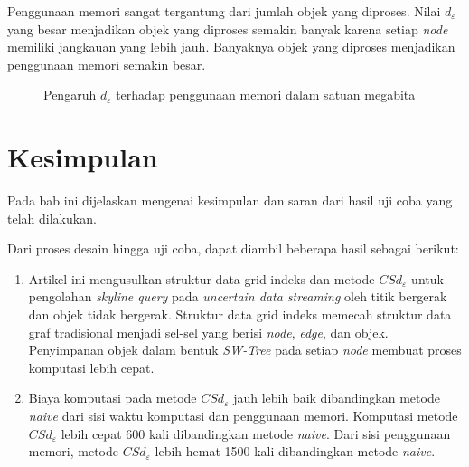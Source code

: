 \documentclass[conference]{IEEEtran}
\begin{document}
Penggunaan memori sangat tergantung dari jumlah objek yang diproses. Nilai $ d_\varepsilon $ yang besar menjadikan objek yang diproses semakin banyak karena setiap \textit{node} memiliki jangkauan yang lebih jauh. Banyaknya objek yang diproses menjadikan penggunaan memori semakin besar.

\begin{figure}[H]
	\centering
	\caption{Pengaruh $ d_\varepsilon $ terhadap penggunaan memori dalam satuan megabita}\label{fig:uji-d-mem}
\end{figure}

\section{Kesimpulan}
Pada bab ini dijelaskan mengenai kesimpulan dan saran dari hasil uji coba yang telah dilakukan.

Dari proses desain hingga uji coba, dapat diambil beberapa hasil sebagai berikut:

\begin{enumerate}
	\item Artikel ini mengusulkan struktur data grid indeks dan metode $ CSd_\varepsilon $ untuk pengolahan \textit{skyline query} pada \textit{uncertain data streaming} oleh titik bergerak dan objek tidak bergerak. Struktur data grid indeks memecah struktur data graf tradisional menjadi sel-sel yang berisi \textit{node}, \textit{edge}, dan objek. Penyimpanan objek dalam bentuk \textit{SW-Tree} pada setiap \textit{node} membuat proses komputasi lebih cepat.
	
	\item Biaya komputasi pada metode $ CSd_\varepsilon $ jauh lebih baik dibandingkan metode \textit{naive} dari sisi waktu komputasi dan penggunaan memori. Komputasi metode $ CSd_\varepsilon $ lebih cepat 600 kali dibandingkan metode \textit{naive}. Dari sisi penggunaan memori, metode $ CSd_\varepsilon $ lebih hemat 1500 kali dibandingkan metode \textit{naive}.
\end{enumerate}
\end{document}
